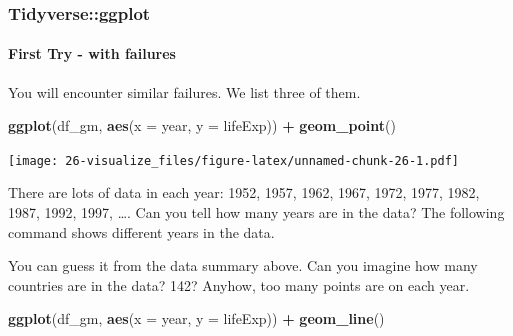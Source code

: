 \documentclass[
  xelatex, ja=standard]{bxjsbook}
\newenvironment{Shaded}{\begin{snugshade}}{\end{snugshade}}
\newcommand{\AttributeTok}[1]{\textcolor[rgb]{0.13,0.29,0.53}{#1}}
\newcommand{\CommentTok}[1]{\textcolor[rgb]{0.56,0.35,0.01}{\textit{#1}}}
\newcommand{\FunctionTok}[1]{\textcolor[rgb]{0.13,0.29,0.53}{\textbf{#1}}}
\newcommand{\NormalTok}[1]{#1}
\newcommand{\SpecialCharTok}[1]{\textcolor[rgb]{0.81,0.36,0.00}{\textbf{#1}}}
\theoremstyle{definition}
\theoremstyle{definition}
\theoremstyle{definition}
\theoremstyle{definition}
\theoremstyle{remark}
\begin{document}
\hypertarget{tidyverseggplot}{%
\subsubsection{Tidyverse::ggplot}\label{tidyverseggplot}}

\hypertarget{first-try---with-failures}{%
\paragraph{First Try - with failures}\label{first-try---with-failures}}

You will encounter similar failures. We list three of them.

\begin{Shaded}
\begin{Highlighting}[]
\FunctionTok{ggplot}\NormalTok{(df\_gm, }\FunctionTok{aes}\NormalTok{(}\AttributeTok{x =}\NormalTok{ year, }\AttributeTok{y =}\NormalTok{ lifeExp)) }\SpecialCharTok{+} \FunctionTok{geom\_point}\NormalTok{()}
\end{Highlighting}
\end{Shaded}

\texttt{[image: 26-visualize\_files/figure-latex/unnamed-chunk-26-1.pdf]}

There are lots of data in each year: 1952, 1957, 1962, 1967, 1972, 1977, 1982, 1987, 1992, 1997, \ldots. Can you tell how many years are in the data? The following command shows different years in the data.

\begin{Shaded}
\end{Shaded}

You can guess it from the data summary above. Can you imagine how many countries are in the data? 142? Anyhow, too many points are on each year.

\begin{Shaded}
\begin{Highlighting}[]
\FunctionTok{ggplot}\NormalTok{(df\_gm, }\FunctionTok{aes}\NormalTok{(}\AttributeTok{x =}\NormalTok{ year, }\AttributeTok{y =}\NormalTok{ lifeExp)) }\SpecialCharTok{+} \FunctionTok{geom\_line}\NormalTok{()}
\end{Highlighting}
\end{Shaded}
\end{document}

